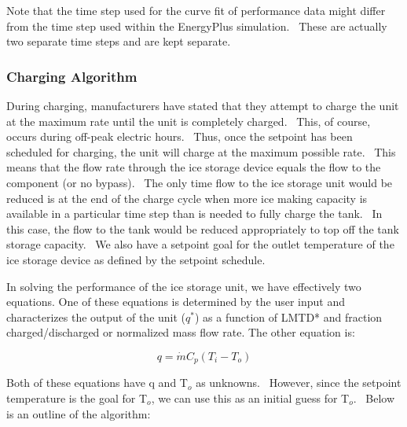 Note that the time step used for the curve fit of performance data might differ from the time step used within the EnergyPlus simulation.~ These are actually two separate time steps and are kept separate.

\subsubsection{Charging Algorithm}\label{charging-algorithm}

During charging, manufacturers have stated that they attempt to charge the unit at the maximum rate until the unit is completely charged.~ This, of course, occurs during off-peak electric hours.~ Thus, once the setpoint has been scheduled for charging, the unit will charge at the maximum possible rate.~ This means that the flow rate through the ice storage device equals the flow to the component (or no bypass).~ The only time flow to the ice storage unit would be reduced is at the end of the charge cycle when more ice making capacity is available in a particular time step than is needed to fully charge the tank.~ In this case, the flow to the tank would be reduced appropriately to top off the tank storage capacity. ~We also have a setpoint goal for the outlet temperature of the ice storage device as defined by the setpoint schedule.

In solving the performance of the ice storage unit, we have effectively two equations.  One of these equations is determined by the user input and characterizes the output of the unit (\(q^*\)) as a function of LMTD* and fraction charged/discharged or normalized mass flow rate. The other equation is:

\begin{equation}
q = \dot m{C_p}\left( {{T_i} - {T_o}} \right)
\end{equation}

Both of these equations have q and T\(_{o}\) as unknowns.~ However, since the setpoint temperature is the goal for T\(_{o}\), we can use this as an initial guess for T\(_{o}\).~ Below is an outline of the algorithm:

